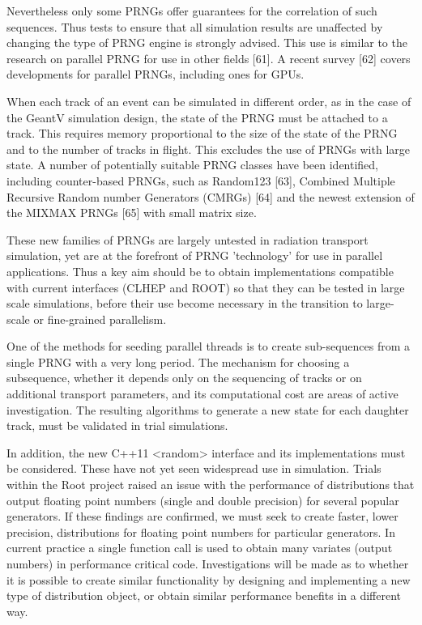\documentclass[12pt,a4paper]{article}
\begin{document}
Nevertheless only some PRNGs offer guarantees for the correlation of
such sequences. Thus tests to ensure that all simulation results are
unaffected by changing the type of PRNG engine is strongly advised. This
use is similar to the research on parallel PRNG for use in other fields
{[}61{]}. A recent survey {[}62{]} covers developments for parallel
PRNGs, including ones for GPUs.

When each track of an event can be simulated in different order, as in
the case of the GeantV simulation design, the state of the PRNG must be
attached to a track. This requires memory proportional to the size of
the state of the PRNG and to the number of tracks in flight. This
excludes the use of PRNGs with large state. A number of potentially
suitable PRNG classes have been identified, including counter-based
PRNGs, such as Random123 {[}63{]}, Combined Multiple Recursive Random
number Generators (CMRGs) {[}64{]} and the newest extension of the
MIXMAX PRNGs {[}65{]} with small matrix size.

These new families of PRNGs are largely untested in radiation transport
simulation, yet are at the forefront of PRNG 'technology' for use in
parallel applications. Thus a key aim should be to obtain
implementations compatible with current interfaces (CLHEP and ROOT) so
that they can be tested in large scale simulations, before their use
become necessary in the transition to large-scale or fine-grained
parallelism.

One of the methods for seeding parallel threads is to create
sub-sequences from a single PRNG with a very long period. The mechanism
for choosing a subsequence, whether it depends only on the sequencing of
tracks or on additional transport parameters, and its computational cost
are areas of active investigation. The resulting algorithms to generate
a new state for each daughter track, must be validated in trial
simulations.

In addition, the new C++11 \textless{}random\textgreater{} interface and
its implementations must be considered. These have not yet seen
widespread use in simulation. Trials within the Root project raised an
issue with the performance of distributions that output floating point
numbers (single and double precision) for several popular generators. If
these findings are confirmed, we must seek to create faster, lower
precision, distributions for floating point numbers for particular
generators. In current practice a single function call is used to obtain
many variates (output numbers) in performance critical code.
Investigations will be made as to whether it is possible to create
similar functionality by designing and implementing a new type of
distribution object, or obtain similar performance benefits in a
different way.
\end{document}
